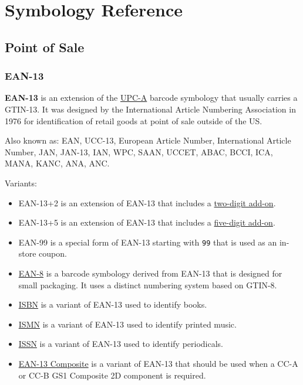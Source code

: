 \hypertarget{symbology-reference}{%
\section{Symbology Reference}\label{symbology-reference}}

\hypertarget{point-of-sale}{%
\subsection{Point of Sale}\label{point-of-sale}}

\hypertarget{ean-13}{%
\subsubsection{EAN-13}\label{ean-13}}

\textbf{EAN-13} is an extension of the \protect\hyperlink{upc-a}{UPC-A}
barcode symbology that usually carries a GTIN-13. It was designed by the
International Article Numbering Association in 1976 for identification
of retail goods at point of sale outside of the US.

Also known as: EAN, UCC-13, European Article Number, International
Article Number, JAN, JAN-13, IAN, WPC, SAAN, UCCET, ABAC, BCCI, ICA,
MANA, KANC, ANA, ANC.

Variants:

\begin{itemize}
\tightlist
\item
  EAN-13+2 is an extension of EAN-13 that includes a
  \protect\hyperlink{ean-2}{two-digit add-on}.
\item
  EAN-13+5 is an extension of EAN-13 that includes a
  \protect\hyperlink{ean-5}{five-digit add-on}.
\item
  EAN-99 is a special form of EAN-13 starting with \texttt{99} that is
  used as an in-store coupon.
\item
  \protect\hyperlink{ean-8}{EAN-8} is a barcode symbology derived from
  EAN-13 that is designed for small packaging. It uses a distinct
  numbering system based on GTIN-8.
\item
  \protect\hyperlink{isbn}{ISBN} is a variant of EAN-13 used to identify
  books.
\item
  \protect\hyperlink{ismn}{ISMN} is a variant of EAN-13 used to identify
  printed music.
\item
  \protect\hyperlink{issn}{ISSN} is a variant of EAN-13 used to identify
  periodicals.
\item
  \protect\hyperlink{gs1-composite-symbols}{EAN-13 Composite} is a
  variant of EAN-13 that should be used when a CC-A or CC-B GS1
  Composite 2D component is required.
\end{itemize}

